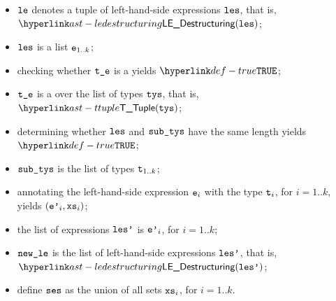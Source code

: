 \ProseParagraph
\AllApply
\begin{itemize}
  \item $\vle$ denotes a tuple of left-hand-side expressions $\les$, that is, $\LEDestructuring(\les)$;
  \item $\les$ is a list $\ve_{1..k}$;
  \item checking whether $\vte$ is a \tupletypeterm{} yields $\True$\ProseTerminateAs{\UnexpectedType};
  \item $\vte$ is a \tupletypeterm{} over the list of types $\tys$, that is, $\TTuple(\tys)$;
  \item determining whether $\les$ and $\subtys$ have the same length yields $\True$\ProseTerminateAs{\UnexpectedType};
  \item $\subtys$ is the list of types $\vt_{1..k}$;
  \item annotating the left-hand-side expression $\ve_i$ with the type $\vt_i$, for $i=1..k$, yields $(\vep_i, \vxs_i)$\ProseOrTypeError;
  \item the list of expressions $\lesp$ is $\vep_i$, for $i=1..k$;
  \item $\newle$ is the list of left-hand-side expressions $\lesp$, that is, $\LEDestructuring(\lesp)$;
  \item define $\vses$ as the union of all sets $\vxs_i$, for $i=1..k$.
\end{itemize}
\FormallyParagraph
\begin{mathpar}
\end{mathpar}

